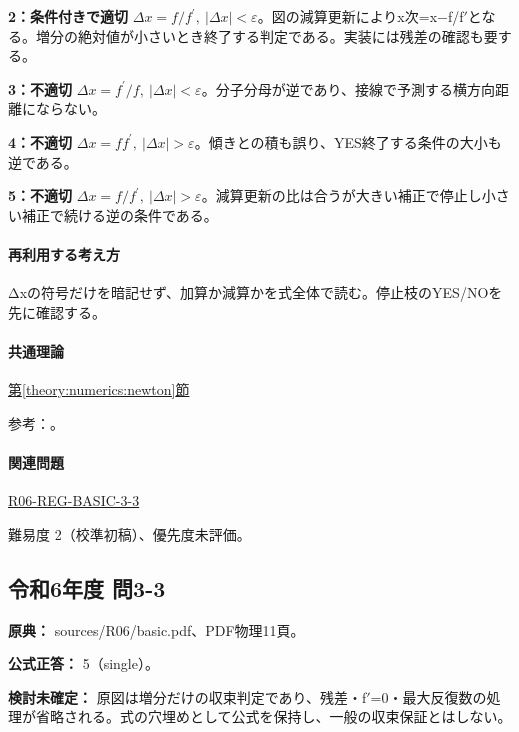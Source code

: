 \noindent\textbf{2：条件付きで適切} \(\Delta x=f/f^\prime,\ |\Delta x|<\varepsilon\)。図の減算更新によりx次=x−f/f\ensuremath{'}となる。増分の絶対値が小さいとき終了する判定である。実装には残差の確認も要する。\par

\noindent\textbf{3：不適切} \(\Delta x=f^\prime/f,\ |\Delta x|<\varepsilon\)。分子分母が逆であり、接線で予測する横方向距離にならない。\par

\noindent\textbf{4：不適切} \(\Delta x=ff^\prime,\ |\Delta x|>\varepsilon\)。傾きとの積も誤り、YES終了する条件の大小も逆である。\par

\noindent\textbf{5：不適切} \(\Delta x=f/f^\prime,\ |\Delta x|>\varepsilon\)。減算更新の比は合うが大きい補正で停止し小さい補正で続ける逆の条件である。\par

\paragraph{再利用する考え方} Δxの符号だけを暗記せず、加算か減算かを式全体で読む。停止枝のYES/NOを先に確認する。

\paragraph{共通理論} \hyperref[theory:numerics:newton]{第\ref*{theory:numerics:newton}節}

\par 参考：\cite{nist_newton}。

\paragraph{関連問題} \hyperref[q:r06-reg-basic-3-3]{R06-REG-BASIC-3-3}

\par 難易度 2（校準初稿）、優先度未評価。

\subsection{令和6年度 問3-3}
\label{q:r06-reg-basic-3-3}

\noindent\textbf{原典：} sources/R06/basic.pdf、PDF物理11頁。

\textbf{公式正答：} 5（single）。

\par\textbf{検討未確定：} 原図は増分だけの収束判定であり、残差・f\ensuremath{'}=0・最大反復数の処理が省略される。式の穴埋めとして公式を保持し、一般の収束保証とはしない。


